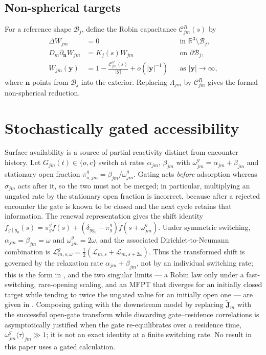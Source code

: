 \documentclass[pdflatex,sn-mathphys-num]{sn-jnl}
\numberwithin{equation}{section}
\theoremstyle{thmstyleone}%
\theoremstyle{definition}
\theoremstyle{remark}
\begin{document}
\begin{appendices}
\subsection{Non-spherical targets}

For a reference shape $\mathcal B_j$, define the Robin capacitance
$\mathcal C^R_{jm}(s)$ by
\begin{subequations}
\begin{align}
\Delta W_{jm}&=0&&\text{in }\mathbb R^3\setminus\overline{\mathcal B_j},\\
D_m\partial_{\mathbf n}W_{jm}&=K_j(s)W_{jm}
&&\text{on }\partial\mathcal B_j,\\
W_{jm}(\mathbf y)&=1-\frac{\mathcal C^R_{jm}(s)}{|\mathbf y|}
+o(|\mathbf y|^{-1})&&\text{as }|\mathbf y|\to\infty,
\end{align}
\end{subequations}
where $\mathbf n$ points from $\mathcal B_j$ into the exterior. Replacing
$\Lambda_{jm}$ by $\mathcal C^R_{jm}$ gives the formal non-spherical reduction.


\section{Stochastically gated accessibility}
\label{app:gating}
Surface availability is a source of partial reactivity distinct from encounter
history. Let $G_{jm}(t)\in\{o,c\}$ switch at rates $\alpha_{jm}$, $\beta_{jm}$
with $\omega^g_{jm}=\alpha_{jm}+\beta_{jm}$ and stationary open fraction
$\pi^g_{o,jm}=\beta_{jm}/\omega^g_{jm}$. Gating acts \emph{before} adsorption
whereas $\sigma_{jm}$ acts after it, so the two must not be merged; in
particular, multiplying an ungated rate by the stationary open fraction is
incorrect, because after a rejected encounter the gate is known to be closed and
the next cycle retains that information. The renewal representation gives the
shift identity
$\widetilde f_{g\mid g_0}(s)=\pi^g_g\widetilde f(s)
+(\delta_{gg_0}-\pi^g_g)\widetilde f(s+\omega^g_{jm})$. Under symmetric
switching, $\alpha_{jm}=\beta_{jm}=\omega$ and
$\omega^g_{jm}=2\omega$, and the associated Dirichlet-to-Neumann combination is
$\mathcal L^g_{m,s,\omega}
=\tfrac12(\mathcal L_{m,s}+\mathcal L_{m,s+2\omega})$. Thus the transformed
shift is governed by the relaxation rate $\alpha_{jm}+\beta_{jm}$, not by an
individual switching rate; this is the form in
\cite{bressloff2026renewal}, and the two singular limits --- a Robin law only
under a fast-switching, rare-opening scaling, and an MFPT that diverges for an
initially closed target while tending to twice the ungated value for an
initially open one --- are given in \cite{bressloff2026renewal}. Composing
gating with the downstream model by replacing $\widetilde{\mathbf J}_m$ with the
successful open-gate transform while discarding gate--residence correlations is
asymptotically justified when the gate re-equilibrates over a residence time,
$\omega^g_{jm}\langle\tau\rangle_{jm}\gg1$; it is not an exact identity at a
finite switching rate. No result in this paper uses
a gated calculation.




\end{appendices}
\end{document}
